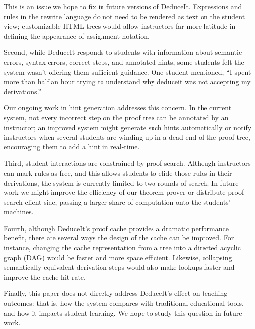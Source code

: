 \documentclass{sigchi}
\begin{document}
This is an issue we hope to fix in future versions of DeduceIt. Expressions and rules in the rewrite language do not need to be rendered as text on the student view; customizable HTML trees would allow instructors far more latitude in defining the appearance of assignment notation.

Second, while DeduceIt responds to students with information about semantic errors, syntax errors, correct steps, and annotated hints, some students felt the system wasn't offering them sufficient guidance. One student mentioned, ``I spent more than half an hour trying to understand why deduceit was not accepting my derivations.''

Our ongoing work in hint generation addresses this concern. In the current system, not every incorrect step on the proof tree can be annotated by an instructor; an improved system might generate such hints automatically or notify instructors when several students are winding up in a dead end of the proof tree, encouraging them to add a hint in real-time.

Third, student interactions are constrained by proof search. Although instructors can mark rules as free, and this allows students to elide those rules in their derivations, the system is currently limited to two rounds of search. In future work we might improve the efficiency of our theorem prover or distribute proof search client-side, passing a larger share of computation onto the students' machines.

Fourth, although DeduceIt's proof cache provides a dramatic performance benefit, there are several ways the design of the cache can be improved. For instance, changing the cache representation from a tree into a directed acyclic graph (DAG) would be faster and more space efficient. Likewise, collapsing semantically equivalent derivation steps would also make lookups faster and improve the cache hit rate.

Finally, this paper does not directly address DeduceIt's effect on teaching outcomes: that is, how the system compares with traditional educational tools, and how it impacts student learning. We hope to study this question in future work.



\end{document}
